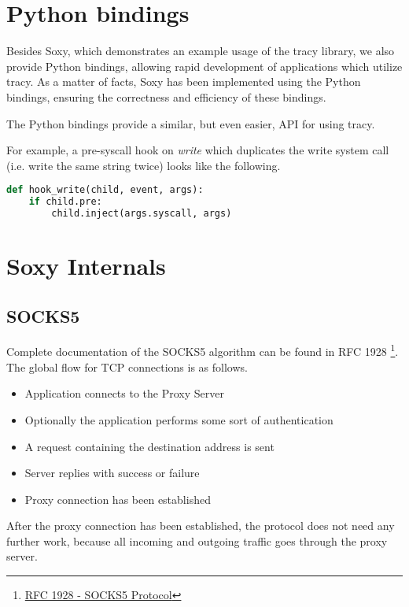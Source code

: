 \documentclass[a4paper, 10pt]{report}
\begin{document}
\section{Python bindings}


Besides Soxy, which demonstrates an example usage of the tracy library, we
also provide Python bindings, allowing rapid development of applications
which utilize tracy. As a matter of facts, Soxy has been implemented using the
Python bindings, ensuring the correctness and efficiency of these bindings.

The Python bindings provide a similar, but even easier, API for using tracy.

For example, a pre-syscall hook on \textit{write} which duplicates the write
system call (i.e. write the same string twice) looks like the following.

\begin{lstlisting}[language=Python]
def hook_write(child, event, args):
    if child.pre:
        child.inject(args.syscall, args)
\end{lstlisting}

\section{Soxy Internals}

\subsection{SOCKS5}

Complete documentation of the SOCKS5 algorithm can be found in
RFC 1928 \footnote{\href{http://www.ietf.org/rfc/rfc1928.txt}
{RFC 1928 - SOCKS5 Protocol}}. The global flow for TCP connections
is as follows.

\begin{itemize}
\item Application connects to the Proxy Server
\item Optionally the application performs some sort of authentication
\item A request containing the destination address is sent
\item Server replies with success or failure
\item Proxy connection has been established
\end{itemize}

After the proxy connection has been established, the protocol does not need
any further work, because all incoming and outgoing traffic goes through the
proxy server.
\end{document}
